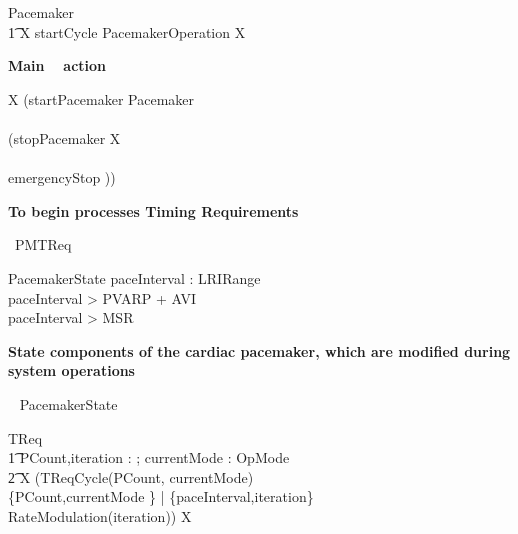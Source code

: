 \begin{circusaction}
Pacemaker \circdef \\
\t1 \circmu X \circspot startCycle \then PacemakerOperation \circseq X 
\end{circusaction}


\textbf{ Main \Circus~ action }\\

\begin{circusaction}
  \circspot \circmu X \circspot (startPacemaker \then Pacemaker \\ 
   \circinterrupt \\
   (stopPacemaker \then X \\ 
  \extchoice \\
  emergencyStop \then \Stop)) 
\end{circusaction}

\begin{circus}
  \circend
\end{circus}





\hline
\textbf{To begin \Circus processes Timing Requirements}
\hline

\begin{circus}
	\circprocess\ PMTReq \circdef \circbegin
\end{circus}

\begin{schema}{PacemakerState}
  paceInterval : LRIRange  \\
  \where
  paceInterval > PVARP + AVI \\
  paceInterval > MSR \\
\end{schema}


\textbf{State components of the cardiac pacemaker, which are modified during system operations}

\begin{circusaction}
  \circstate ~ PacemakerState
\end{circusaction}

\begin{circusaction}
TReq \circdef \\
\t1 \circvres PCount,iteration : \nat ; \circvres currentMode : OpMode \\
\t2 \circspot \circmu X \circspot (TReqCycle(PCount, currentMode) \\
\linter \{PCount,currentMode \} | \{paceInterval,iteration\}  \rinter \\
RateModulation(iteration)) \circseq X \\
\end{circusaction}



